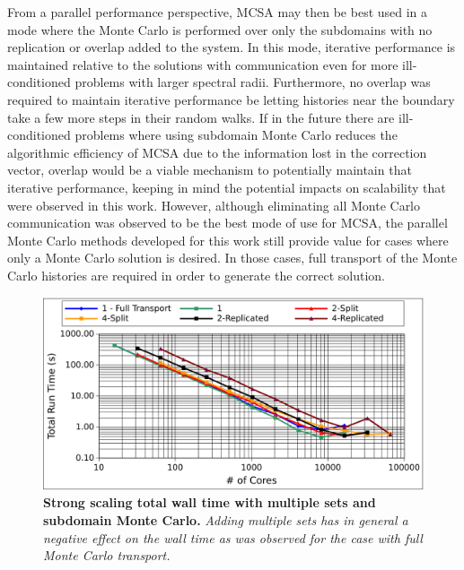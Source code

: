 From a parallel performance perspective, MCSA may then be best used in
a mode where the Monte Carlo is performed over only the subdomains
with no replication or overlap added to the system. In this mode,
iterative performance is maintained relative to the solutions with
communication even for more ill-conditioned problems with larger
spectral radii. Furthermore, no overlap was required to maintain
iterative performance be letting histories near the boundary take a
few more steps in their random walks. If in the future there are
ill-conditioned problems where using subdomain Monte Carlo reduces the
algorithmic efficiency of MCSA due to the information lost in the
correction vector, overlap would be a viable mechanism to potentially
maintain that iterative performance, keeping in mind the potential
impacts on scalability that were observed in this work. However,
although eliminating all Monte Carlo communication was observed to be
the best mode of use for MCSA, the parallel Monte Carlo methods
developed for this work still provide value for cases where only a
Monte Carlo solution is desired. In those cases, full transport of the
Monte Carlo histories are required in order to generate the correct
solution.

\begin{figure}[t!]
  \begin{center}
    \includegraphics[width=6in]{chapters/parallel_mc/titan_strong_subdomain_ms_time.pdf}
  \end{center}
  \caption{\textbf{Strong scaling total wall time with multiple sets
      and subdomain Monte Carlo.} \textit{Adding multiple sets has in
      general a negative effect on the wall time as was observed for
      the case with full Monte Carlo transport.}}
  \label{fig:titan_strong_subdomain_ms_time}
\end{figure}

